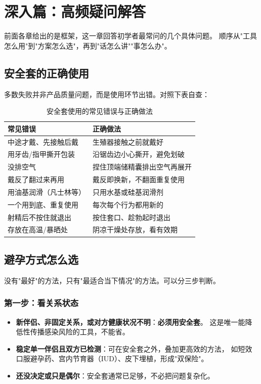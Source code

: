 \documentclass[12pt,UTF8,openany]{ctexbook}
\begin{document}
\chapter{深入篇：高频疑问解答}
\label{chap:faq}

前面各章给出的是框架，这一章回答初学者最常问的几个具体问题。
顺序从"工具怎么用"到"方案怎么选"，再到"话怎么讲""事怎么办"。

\section{安全套的正确使用}

多数失败并非产品质量问题，而是使用环节出错。对照下表自查：

\begin{table}[htbp]
  \centering
  \caption{安全套使用的常见错误与正确做法}
  \begin{tabularx}{\textwidth}{@{}X X@{}}
    \toprule
    \textbf{常见错误} & \textbf{正确做法} \\
    \midrule
    中途才戴、先接触后戴 & 生殖器接触之前就戴好 \\
    用牙齿/指甲撕开包装   & 沿锯齿边小心撕开，避免划破 \\
    没排空气               & 捏住顶端储精囊排出空气再展开 \\
    戴反了翻过来再用       & 戴反即换新，不翻面重复使用 \\
    用油基润滑（凡士林等） & 只用水基或硅基润滑剂 \\
    一个用到底、重复使用   & 每次每个行为都用新的 \\
    射精后不按住就退出     & 按住套口、趁勃起时退出 \\
    存放在高温/暴晒处      & 阴凉干燥处存放，看有效期 \\
    \bottomrule
  \end{tabularx}
\end{table}

\section{避孕方式怎么选}

没有"最好"的方法，只有"最适合当下情况"的方法。可以分三步判断。

\subsection*{第一步：看关系状态}

\begin{itemize}
  \item \textbf{新伴侣、非固定关系，或对方健康状况不明}：\textbf{必须用安全套}。
        这是唯一能降低性传播感染风险的工具，不能省。
  \item \textbf{稳定单一伴侣且双方已检测}：可在安全套之外，叠加更高效的方法，
        如短效口服避孕药、宫内节育器（IUD）、皮下埋植，形成"双保险"。
  \item \textbf{还没决定或只是偶尔}：安全套通常已足够，不必把问题复杂化。
\end{itemize}
\end{document}
